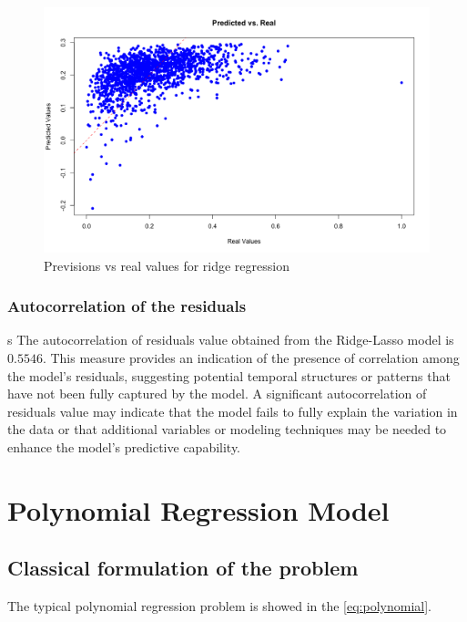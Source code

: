 \documentclass[10pt]{article} %
\begin{document}
    \begin{figure}
        \centering
        \includegraphics[scale=0.45]{Assets/ridgerealvspredicted.png}
        \caption{Previsions vs real values for ridge regression}
        \label{fig:enter-label}
    \end{figure}
    \newpage
    \subsubsection{Autocorrelation of the residuals}s
    The autocorrelation of residuals value obtained from the Ridge-Lasso model is $0.5546$. 
    This measure provides an indication of the presence of correlation among the model's residuals, suggesting potential temporal structures or patterns that have not been fully captured by the model. 
    A significant autocorrelation of residuals value may indicate that the model fails to fully explain the variation in the data or that additional variables or modeling techniques may be needed to enhance the model's predictive capability.

    \section{Polynomial Regression Model}
    \subsection{Classical formulation of the problem}

    The typical polynomial regression problem \cite{james2013chapter7-1} is showed in the \ref{eq:polynomial}.
    
\end{document}
